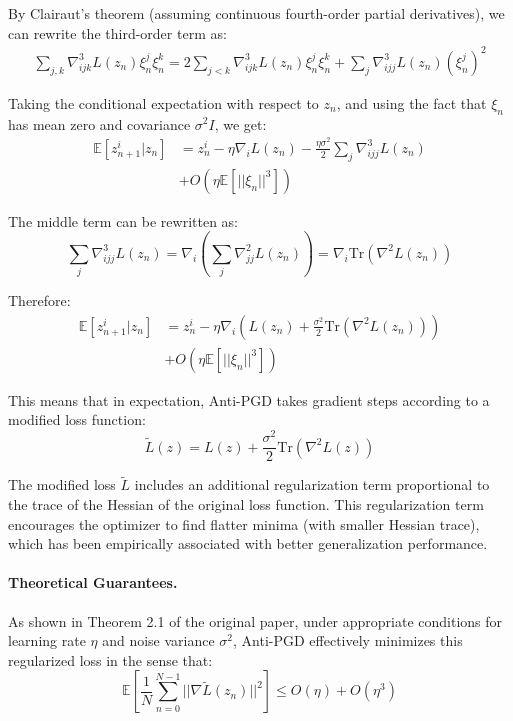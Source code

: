 By Clairaut's theorem (assuming continuous fourth-order partial derivatives), we can rewrite the third-order term as:
\begin{align}
\sum_{j,k} \nabla^3_{ijk}L(z_n) \xi^j_n \xi^k_n = 2\sum_{j<k} \nabla^3_{ijk}L(z_n) \xi^j_n \xi^k_n + \sum_j \nabla^3_{ijj}L(z_n) (\xi^j_n)^2
\end{align}

Taking the conditional expectation with respect to $z_n$, and using the fact that $\xi_n$ has mean zero and covariance $\sigma^2I$, we get:
\begin{align}
\mathbb{E}[z^i_{n+1} | z_n] &= z^i_n - \eta \nabla_i L(z_n) - \frac{\eta\sigma^2}{2} \sum_j \nabla^3_{ijj}L(z_n) \\
&+ O(\eta\mathbb{E}[||\xi_n||^3])
\end{align}

The middle term can be rewritten as:
\begin{equation}
\sum_j \nabla^3_{ijj}L(z_n) = \nabla_i \left( \sum_j \nabla^2_{jj}L(z_n) \right) = \nabla_i \text{Tr}(\nabla^2 L(z_n))
\end{equation}

Therefore:
\begin{align}
\mathbb{E}[z^i_{n+1} | z_n] &= z^i_n - \eta \nabla_i \left( L(z_n) + \frac{\sigma^2}{2} \text{Tr}(\nabla^2 L(z_n)) \right) \\
&+ O(\eta\mathbb{E}[||\xi_n||^3])
\end{align}

This means that in expectation, Anti-PGD takes gradient steps according to a modified loss function:
\begin{equation}
\tilde{L}(z) = L(z) + \frac{\sigma^2}{2} \text{Tr}(\nabla^2 L(z))
\end{equation}

The modified loss $\tilde{L}$ includes an additional regularization term proportional to the trace of the Hessian of the original loss function. This regularization term encourages the optimizer to find flatter minima (with smaller Hessian trace), which has been empirically associated with better generalization performance.

\paragraph{Theoretical Guarantees.}
As shown in Theorem 2.1 of the original paper, under appropriate conditions for learning rate $\eta$ and noise variance $\sigma^2$, Anti-PGD effectively minimizes this regularized loss in the sense that:
\begin{equation}
\mathbb{E}\left[ \frac{1}{N} \sum_{n=0}^{N-1} ||\nabla \tilde{L}(z_n)||^2 \right] \leq O(\eta) + O(\eta^3)
\end{equation}

